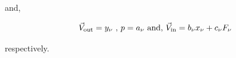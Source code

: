 \documentclass[a4paper,12pt]{article}
\begin{document}
\noindent and,

\begin{equation}
 \vec V_{\rm out} = y_{\nu} \mbox{ , } p = a_{\nu} \mbox{ and, } \vec V_{\rm in} = b_{\nu}x_{\nu} + c_{\nu}F_{\nu}
\end{equation}

\noindent respectively.
% 
% 
% 
% 
% 
% 
% 
% 
% 
% 
\end{document}
